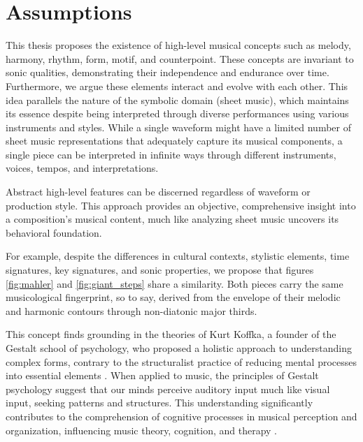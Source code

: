 \section{Assumptions}

This thesis proposes the existence of high-level musical concepts such as melody, harmony, rhythm, form, motif, and counterpoint. These concepts are invariant to sonic qualities, demonstrating their independence and endurance over time. Furthermore, we argue these elements interact and evolve with each other. This idea parallels the nature of the symbolic domain (sheet music), which maintains its essence despite being interpreted through diverse performances using various instruments and styles. While a single waveform might have a limited number of sheet music representations that adequately capture its musical components, a single piece can be interpreted in infinite ways through different instruments, voices, tempos, and interpretations. 

Abstract high-level features can be discerned regardless of waveform or production style. This approach provides an objective, comprehensive insight into a composition's musical content, much like analyzing sheet music uncovers its behavioral foundation.

For example, despite the differences in cultural contexts, stylistic elements, time signatures, key signatures, and sonic properties, we propose that figures \ref{fig:mahler} and \ref{fig:giant_steps} share a similarity. Both pieces carry the same musicological fingerprint, so to say, derived from the envelope of their melodic and harmonic contours through non-diatonic major thirds.

This concept finds grounding in the theories of Kurt Koffka, a founder of the Gestalt school of psychology, who proposed a holistic approach to understanding complex forms, contrary to the structuralist practice of reducing mental processes into essential elements \cite{Koffka2013PrinciplesPsychology}. When applied to music, the principles of Gestalt psychology suggest that our minds perceive auditory input much like visual input, seeking patterns and structures. This understanding significantly contributes to the comprehension of cognitive processes in musical perception and organization, influencing music theory, cognition, and therapy \cite{Lerdahl1985AMusic}.

